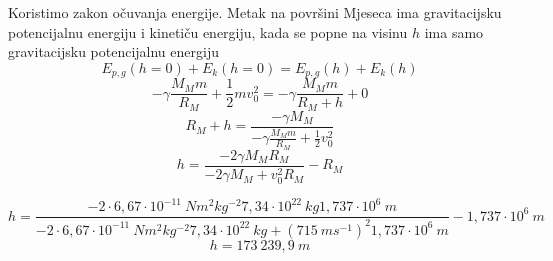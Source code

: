 


Koristimo zakon očuvanja energije. Metak na površini Mjeseca ima gravitacijsku potencijalnu energiju i kinetiču energiju, 
kada se popne na visinu $h$ ima samo gravitacijsku potencijalnu energiju
$$ E_{p,g}(h=0) +  E_k(h=0) = E_{p,g}(h) +  E_k(h) $$
$$ -\gamma\frac{M_Mm}{R_M} + \frac{1}{2}mv_0^2  =  -\gamma\frac{M_Mm}{R_M+h} + 0 $$
$$ R_M+h = \frac{-\gamma M_M}{-\gamma\frac{M_Mm}{R_M} + \frac{1}{2}v_0^2  } $$
$$ h = \frac{ -2\gamma M_M R_M}{-2\gamma M_M + v_0^2R_M} - R_M  $$

$$ h = \frac{ -2\cdot6,67\cdot  10^{−11}\ Nm^2kg^{−2}   7,34\cdot10^{22}\ kg 1,737\cdot10^6\ m}
{-2\cdot6,67\cdot  10^{−11}\ Nm^2kg^{−2} 7,34\cdot10^{22}\ kg + (715\ ms^{-1})^2  1,737\cdot10^6\ m} - 1,737\cdot10^6\ m  $$
$$ h=173\ 239,9\  m  $$
